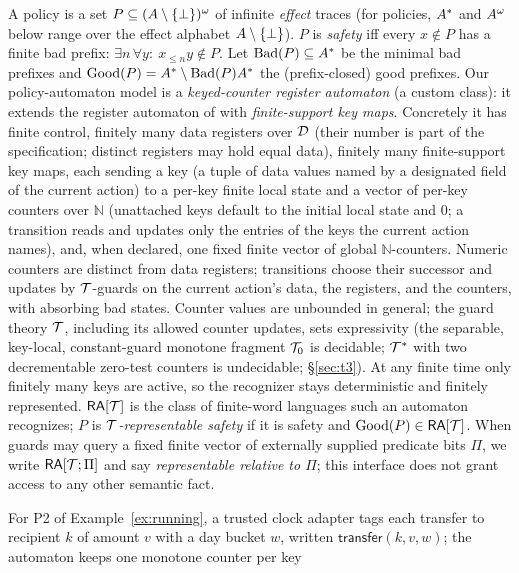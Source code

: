\begin{definition}\label{def:safety}
A policy is a set $P\subseteq(A\setminus\{\bot\})^{\omega}$ of infinite \emph{effect} traces (for policies, $A^{*}$ and $A^{\omega}$ below range over the effect alphabet $A\setminus\{\bot\}$). $P$ is \emph{safety}
\citep{alpern1987recognizing} iff every $x\notin P$ has a finite bad prefix:
$\exists n\,\forall y:\ x_{\le n}y\notin P$. Let $\mathrm{Bad}(P)\subseteq A^{*}$ be the
minimal bad prefixes and $\mathrm{Good}(P)=A^{*}\setminus\mathrm{Bad}(P)A^{*}$ the
(prefix-closed) good prefixes. Our policy-automaton model is a
\emph{keyed-counter register automaton} (a custom class): it extends the register
automaton of \citet{kaminski1994finite} with \emph{finite-support key maps}. Concretely it has
finite control, finitely many data registers over $\mathcal{D}$ (their number is part of the specification; distinct registers may hold equal data), finitely many finite-support key
maps, each sending a key (a tuple of data values named by a designated field of the current
action) to a per-key finite local state and a vector of per-key counters over $\mathbb N$
(unattached keys default to the initial local state and $0$; a transition reads and updates only
the entries of the keys the current action names), and,
when declared, one fixed finite vector of global $\mathbb N$-counters. Numeric
counters are distinct from data registers; transitions choose their successor and updates by $\mathcal{T}$-guards on the current
action's data, the registers, and the counters, with absorbing bad states. Counter values
are unbounded in general; the guard theory $\mathcal{T}$, including its allowed counter updates, sets expressivity (the
separable, key-local, constant-guard monotone fragment $\mathcal{T}_0$ is decidable;
$\mathcal{T}^\ast$ with two decrementable zero-test counters is undecidable;
\S\ref{sec:t3}). At any finite time
only finitely many keys are active, so the recognizer stays deterministic and finitely
represented. $\mathsf{RA}[\mathcal{T}]$ is the class of finite-word languages such an
automaton recognizes; $P$ is \emph{$\mathcal{T}$-representable safety} if it is safety and
$\mathrm{Good}(P)\in\mathsf{RA}[\mathcal{T}]$. When guards may query a fixed finite vector of externally supplied
predicate bits $\Pi$, we write $\mathsf{RA}[\mathcal{T};\Pi]$ and say \emph{representable relative
to $\Pi$}; this interface does not grant access to any other semantic fact.
\end{definition}
For P2 of Example~\ref{ex:running}, a trusted clock adapter tags each transfer
to recipient $k$ of amount $v$ with a day bucket $w$, written
$\mathsf{transfer}(k,v,w)$; the automaton keeps one monotone counter per key
